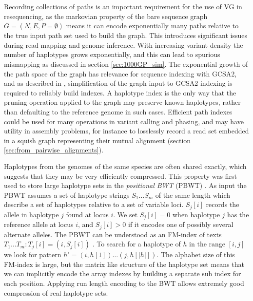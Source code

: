 Recording collections of paths is an important requirement for the use of VG in resequencing, as the markovian property of the bare sequence graph $G = (N, E, P= \emptyset)$ means it can encode exponentially many paths relative to the true input path set used to build the graph.
This introduces significant issues during read mapping and genome inference.
With increasing variant density the number of haplotypes grows exponentially, and this can lead to spurious mismapping as discussed in section \ref{sec:1000GP_sim}.
The exponential growth of the path space of the graph has relevance for sequence indexing with GCSA2, and as described in \label{sec:graph_sequence_indexes}, simplification of the graph input to GCSA2 indexing is required to reliably build indexes.
A haplotype index is the only way that the pruning operation applied to the graph may preserve known haplotypes, rather than defaulting to the reference genome in such cases.
Efficient path indexes could be used for many operations in variant calling and phasing, and may have utility in assembly problems, for instance to losslessly record a read set embedded in a squish graph representing their mutual alignment (section \ref{sec:from_pairwise_alignments}).

Haplotypes from the genomes of the same species are often shared exactly, which suggests that they may be very efficiently compressed.
This property was first used to store large haplotype sets in the \emph{positional BWT} (PBWT) \cite{durbin2014efficient}.
As input the PBWT assumes a set of haplotype strings $S_1 \ldots S_m$ of the same length which describe a set of haplotypes relative to a set of variable loci.
$S_j[i]$ records the allele in haplotype $j$ found at locus $i$.
We set $S_j[i] = 0$ when haplotype $j$ has the reference allele at locus $i$, and $S_j[i] > 0$ if it encodes one of possibly several alternate alleles.
The PBWT can be understood as an FM-index of texts $T_1 \ldots T_m : T_j[i] = (i, S_j[i])$ \cite{gagie2017wheeler}.
To search for a haplotype of $h$ in the range $[i,j]$ we look for pattern $h' = (i, h[1]) \ldots (j, h[|h|])$.
The alphabet size of this FM-index is large, but the matrix like structure of the haplotype set means that we can implicitly encode the array indexes by building a separate sub index for each position.
Applying run length encoding to the BWT allows extremely good compression of real haplotype sets.

